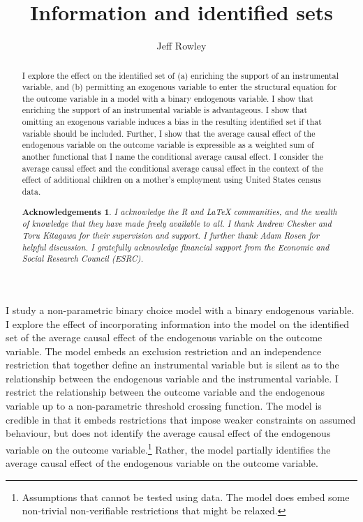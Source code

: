 \documentclass[12pt,a4paper,twoside]{article}
\title{Information and identified sets}
\author{Jeff Rowley}
\newtheorem*{Acknowledgements}{Acknowledgements}
\numberwithin{equation}{section}
\newcommand{\ESRC}{I gratefully acknowledge financial support from the Economic and Social Research Council (ESRC).}
\newcommand{\RLaTeX}{I acknowledge the \emph{R} and \emph{\LaTeX} communities, and the wealth of knowledge that they have made freely available to all.}
\begin{document}
\maketitle
\vspace{10mm}
\begin{abstract}
\noindent\footnotesize I explore the effect on the identified set of (a) enriching the support of an instrumental variable, and (b) permitting an exogenous variable to enter the structural equation for the outcome variable in a model with a binary endogenous variable. I show that enriching the support of an instrumental variable is advantageous. I show that omitting an exogenous variable induces a bias in the resulting identified set if that variable should be included. Further, I show that the average causal effect of the endogenous variable on the outcome variable is expressible as a weighted sum of another functional that I name the conditional average causal effect. I consider the average causal effect and the conditional average causal effect in the context of the effect of additional children on a mother's employment using United States census data.
\begin{Acknowledgements}
{\RLaTeX} I thank Andrew Chesher and Toru Kitagawa for their supervision and support. I further thank Adam Rosen for helpful discussion. {\ESRC}
\end{Acknowledgements}
\end{abstract}
\vspace{5mm}
\normalsize I study a non-parametric binary choice model with a binary endogenous variable. I explore the effect of incorporating information into the model on the identified set of the average causal effect of the endogenous variable on the outcome variable. The model embeds an exclusion restriction and an independence restriction that together define an instrumental variable but is silent as to the relationship between the endogenous variable and the instrumental variable. I restrict the relationship between the outcome variable and the endogenous variable up to a non-parametric threshold crossing function. The model is credible \citep{book.manski} in that it embeds restrictions that impose weaker constraints on assumed behaviour, but does not identify the average causal effect of the endogenous variable on the outcome variable.\footnote{Assumptions that cannot be tested using data. The model does embed some non-trivial non-verifiable restrictions that might be relaxed.} Rather, the model partially identifies the average causal effect of the endogenous variable on the outcome variable. 
\end{document}

